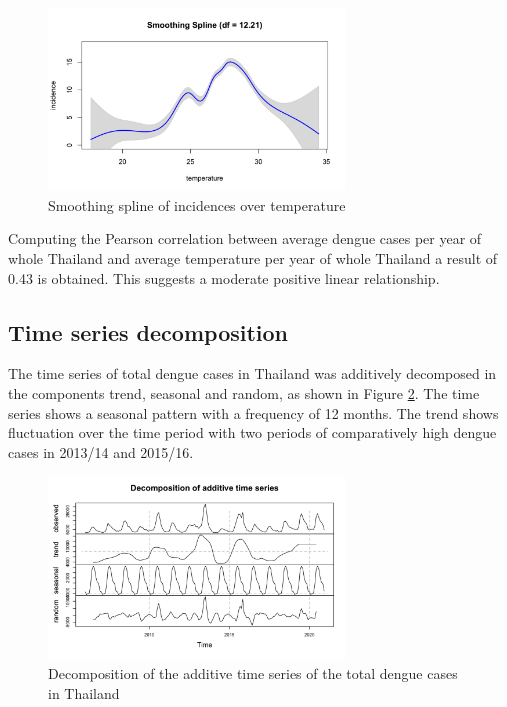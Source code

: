 \begin{figure}[htbp] 
	\centering
	\includegraphics[width=0.7\textwidth]{fig/Smoothing_spline.png}
	\caption{Smoothing spline of incidences over temperature}
	\label{fig:smooth_spline}
\end{figure}

Computing the Pearson correlation between average dengue cases per year of whole Thailand and average temperature per year of whole Thailand a result of 0.43 is obtained. This suggests a moderate positive linear relationship. 

	\subsection{Time series decomposition}The time series of total dengue cases in Thailand was additively decomposed in the components trend, seasonal and random, as shown in Figure \ref{fig:decomp_ts_dengue}. The time series shows a seasonal pattern with a frequency of 12 months. The trend shows fluctuation over the time period with two periods of comparatively high dengue cases in 2013/14 and 2015/16.
	
	\begin{figure}[htbp] 
		\centering
		\includegraphics[width=0.7\textwidth]{fig/Decomposition_of_add_ts.png}
		\caption{ Decomposition of the additive time series of the total dengue cases in Thailand}
		\label{fig:decomp_ts_dengue}
	\end{figure}
	
